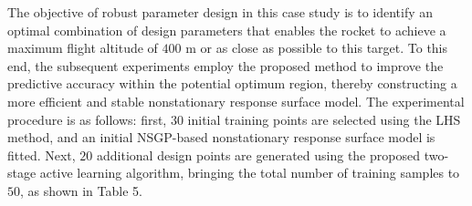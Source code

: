 \documentclass[]{interact}
\theoremstyle{plain}%
\theoremstyle{definition}
\theoremstyle{remark}
\begin{document}
The objective of robust parameter design in this case study is to identify an optimal combination of design parameters that enables the rocket to achieve a maximum flight altitude of $400$ m or as close as possible to this target. To this end, the subsequent experiments employ the proposed method to improve the predictive accuracy within the potential optimum region, thereby constructing a more efficient and stable nonstationary response surface model. The experimental procedure is as follows: first, $30$ initial training points are selected using the LHS method, and an initial NSGP-based nonstationary response surface model is fitted. Next, $20$ additional design points are generated using the proposed two-stage active learning algorithm, bringing the total number of training samples to $50$, as shown in Table 5.
\end{document}

